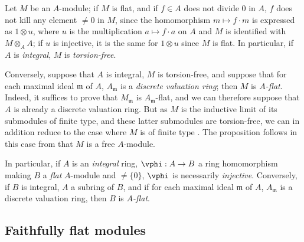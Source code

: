 \begin{env}[6.3.4]
\label{0.6.3.4}
Let $M$ be an $A$-module; if $M$ is flat, and if $f\in A$ does not divide $0$ in $A$, $f$
does not kill any element $\neq 0$ in $M$, since the homomorphism $m\mapsto f\cdot m$ is
expressed as $1\otimes u$, where $u$ is the multiplication $a\mapsto f\cdot a$ on $A$ and
$M$ is identified with $M\otimes_A A$; if $u$ is injective, it is the same for $1\otimes u$
since $M$ is flat. In particular, if $A$ is \emph{integral}, $M$ is \emph{torsion-free}.

Conversely, suppose that $A$ is integral, $M$ is torsion-free, and suppose that for each
maximal ideal $\mathfrak{m}$ of $A$, $A_\mathfrak{m}$ is a \emph{discrete valuation ring};
then $M$ is \emph{$A$-flat}. Indeed, it suffices  to prove that
$M_\mathfrak{m}$ is $A_\mathfrak{m}$-flat, and we can therefore suppose that $A$ is already
a discrete valuation ring. But as $M$ is the inductive limit of its submodules of finite
type, and these latter submodules are torsion-free, we can in addition reduce to the case
where $M$ is of finite type . The proposition follows in this
case from that $M$ is a free $A$-module.

In particular, if $A$ is an \emph{integral} ring, $\vphi:A\to B$ a ring homomorphism making
$B$ a \emph{flat} $A$-module and $\neq\{0\}$, $\vphi$ is necessarily \emph{injective}.
Conversely, if $B$ is integral, $A$ a subring of $B$, and if for each maximal ideal
$\mathfrak{m}$ of $A$, $A_\mathfrak{m}$ is a discrete valuation ring, then $B$ is
\emph{$A$-flat}.
\end{env}

\subsection{Faithfully flat modules}
\label{subsection:0.6.4}

